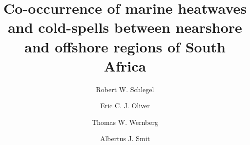 \documentclass[a4paper,10pt,review]{elsarticle}
\begin{document}
\begin{frontmatter}

\title{Co-occurrence of marine heatwaves and cold-spells between nearshore and offshore regions of South Africa}

\author[firstaddress]{Robert W. Schlegel}

\author[secondaddress,thirdaddress]{Eric C. J. Oliver}
\author[fourthaddress]{Thomas W. Wernberg}
\author[firstaddress]{Albertus J. Smit}


\address[firstaddress]{Department of Biodiversity and Conservation Biology, University of the Western Cape, Private Bag X17, Bellville 7535, South Africa}

\address[secondaddress]{ARC Centre of Excellence for Climate System Science, Australia}

\address[thirdaddress]{Institute for Marine and Antarctic Studies, University of Tasmania, Hobart, Australia}

\address[fourthaddress]{UWA Oceans Institute and School of Plant Biology, The University of Western Australia, Crawley, 6009 Western Australia, Australia}


\end{frontmatter}
\end{document}
